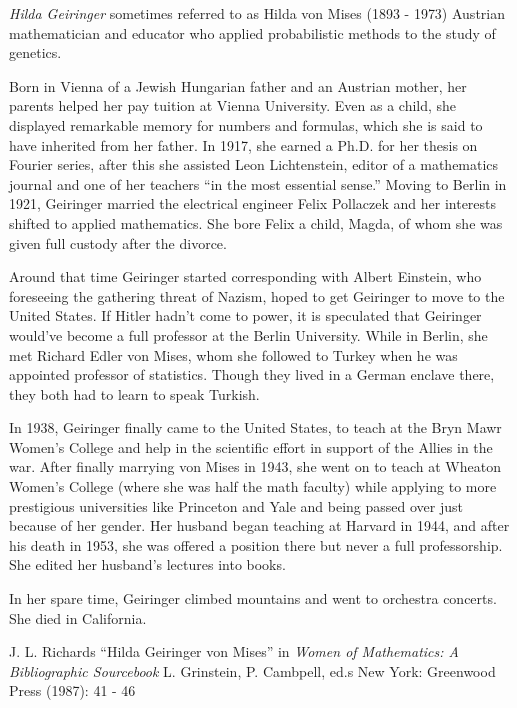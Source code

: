\documentclass[12pt]{article}
\begin{document}

\emph{Hilda Geiringer} sometimes referred to as {Hilda von Mises} (1893 - 1973) Austrian mathematician and educator who applied probabilistic methods to the study of genetics.

Born in Vienna of a Jewish Hungarian father and an Austrian mother, her parents helped her pay tuition at Vienna University. Even as a child, she displayed remarkable memory for numbers and formulas, which she is said to have inherited from her father. In 1917, she earned a Ph.D. for her thesis on Fourier series, after this she assisted Leon Lichtenstein, editor of a mathematics journal and one of her teachers ``in the most essential sense.'' Moving to Berlin in 1921, Geiringer married the electrical engineer Felix Pollaczek and her interests shifted to applied mathematics. She bore Felix a child, Magda, of whom she was given full custody after the divorce.

Around that time Geiringer started corresponding with Albert Einstein, who foreseeing the gathering threat of Nazism, hoped to get Geiringer to move to the United States. If Hitler hadn't come to power, it is speculated that Geiringer would've become a full professor at the Berlin University. While in Berlin, she met Richard Edler von Mises, whom she followed to Turkey when he was appointed professor of statistics. Though they lived in a German enclave there, they both had to learn to speak Turkish.

In 1938, Geiringer finally came to the United States, to teach at the Bryn Mawr Women's College and help in the scientific effort in support of the Allies in the war. After finally marrying von Mises in 1943, she went on to teach at Wheaton Women's College (where she was half the math faculty) while applying to more prestigious universities like Princeton and Yale and being passed over just because of her gender. Her husband began teaching at Harvard in 1944, and after his death in 1953, she was offered a position there but never a full professorship. She edited her husband's lectures into books.

In her spare time, Geiringer climbed mountains and went to orchestra concerts. She died in California.

\begin{thebibliography}{1}
 J. L. Richards ``Hilda Geiringer von Mises'' in {\it Women of Mathematics: A Bibliographic Sourcebook} L. Grinstein, P. Cambpell, ed.s New York: Greenwood Press (1987): 41 - 46
\end{thebibliography}
\end{document}
